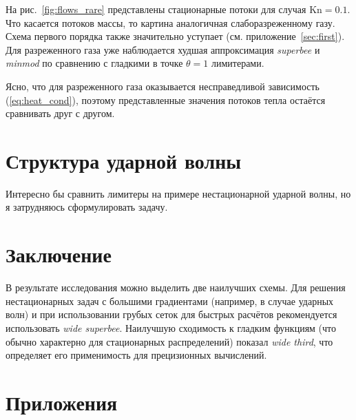 \documentclass[a4paper,10pt]{article}
\newcommand{\Kn}{\mathrm{Kn}}
\begin{document}
На рис.~\ref{fig:flows_rare} представлены стационарные потоки для случая \(\Kn=0.1\).
Что касается потоков массы, то картина аналогичная слаборазреженному газу.
Схема первого порядка также значительно уступает (см. приложение~\ref{sec:first}).
Для разреженного газа уже наблюдается худшая аппроксимация \textit{superbee} и \textit{minmod}
по сравнению с гладкими в точке \(\theta=1\) лимитерами.

Ясно, что для разреженного газа оказывается несправедливой зависимость (\ref{eq:heat_cond}),
поэтому представленные значения потоков тепла остаётся сравнивать друг с другом.

\section{Структура ударной волны}
Интересно бы сравнить лимитеры на примере нестационарной ударной волны, но я затрудняюсь сформулировать задачу.

\section{Заключение}
В результате исследования можно выделить две наилучших схемы.
Для решения нестационарных задач с большими градиентами (например, в случае ударных волн)
и при использовании грубых сеток для быстрых расчётов рекомендуется использовать \textit{wide superbee}.
Наилучшую сходимость к гладким функциям (что обычно характерно для стационарных распределений) показал \textit{wide third},
что определяет его применимость для прецизионных вычислений.

\newpage
\section{Приложения}
\end{document}
